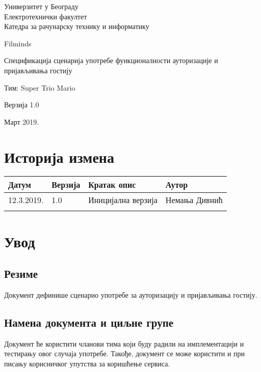 \documentclass[12pt,a4paper]{article}
\begin{document}
\begin{titlepage}
\begin{center}
  Универзитет у Београду \\
  Електротехнички факултет \\
  Катедра за рачунарску технику и информатику \\
  \vfill

  {\fontsize{50}{60}\selectfont Filminds}
  \vskip 0.6cm

  {\large Спецификација сценарија употребе функционалности ауторизације и пријављивања гостију }
  \vskip 0.3cm
  
  {\large Тим: Super Trio Mario}
  \vskip 0.3cm

  {\large Верзија 1.0}

  \vfill
  \vfill

  Март 2019.
\hfill

\end{center}
\end{titlepage}

\section*{Историја измена}
\noindent
\setcellgapes{4pt}
\makegapedcells
\begin{tabularx}{\linewidth}{|l|l|X|X|}
    \hline
    \textbf{Датум} & \textbf{Верзија} & \textbf{Кратак опис} & \textbf{Аутор} \\
    \hline
    12.3.2019. & 1.0 & Иницијална верзија & Немања Дивнић \\
    \hline
    & & & \\
    \hline
\end{tabularx}
\newpage

\tableofcontents
\newpage

\section{Увод}
\subsection{Резиме}
Документ дефинише сценарио употребе за ауторизацију и пријављивања гостију.
\subsection{Намена документа и циљне групе}
Документ ће користити чланови тима који буду радили на имплементацији и тестирању овог случаја употребе. Такође, документ се може користити и при писању корисничког упутства за коришћење сервиса.
\end{document}
